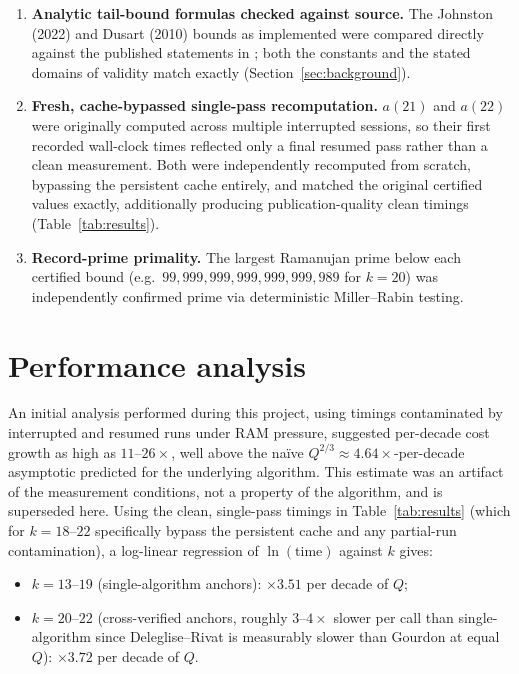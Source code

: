 \documentclass[11pt]{amsart}
\begin{document}
\begin{enumerate}
  prime density arguments, with no discontinuity at the transition into
  the cross-verified regime.
  \item \textbf{Analytic tail-bound formulas checked against source.}
  The Johnston (2022) and Dusart (2010) bounds as implemented were
  compared directly against the published statements in
  \cite{johnston2022,dusart2010}; both the constants and the stated
  domains of validity match exactly (Section~\ref{sec:background}).
  \item \textbf{Fresh, cache-bypassed single-pass recomputation.}
  $a(21)$ and $a(22)$ were originally computed across multiple
  interrupted sessions, so their first recorded wall-clock times
  reflected only a final resumed pass rather than a clean measurement.
  Both were independently recomputed from scratch, bypassing the
  persistent cache entirely, and matched the original certified values
  exactly, additionally producing publication-quality clean timings
  (Table~\ref{tab:results}).
  \item \textbf{Record-prime primality.} The largest Ramanujan prime
  below each certified bound (e.g.\ $99{,}999{,}999{,}999{,}999{,}999{,}989$
  for $k=20$) was independently confirmed prime via deterministic
  Miller--Rabin testing.
\end{enumerate}

\section{Performance analysis}
\label{sec:performance}

An initial analysis performed during this project, using timings
contaminated by interrupted and resumed runs under RAM pressure,
suggested per-decade cost growth as high as $11$--$26\times$, well above
the na\"ive $Q^{2/3} \approx 4.64\times$-per-decade asymptotic predicted
for the underlying algorithm. This estimate was an artifact of the
measurement conditions, not a property of the algorithm, and is
superseded here. Using the clean, single-pass timings in
Table~\ref{tab:results} (which for $k=18$--$22$ specifically bypass the
persistent cache and any partial-run contamination), a log-linear
regression of $\ln(\text{time})$ against $k$ gives:

\begin{itemize}
  \item $k=13$--$19$ (single-algorithm anchors): $\times3.51$ per decade of $Q$;
  \item $k=20$--$22$ (cross-verified anchors, roughly $3$--$4\times$
  slower per call than single-algorithm since Deleglise--Rivat is
  measurably slower than Gourdon at equal $Q$): $\times3.72$ per decade of $Q$.
\end{itemize}
\end{document}

